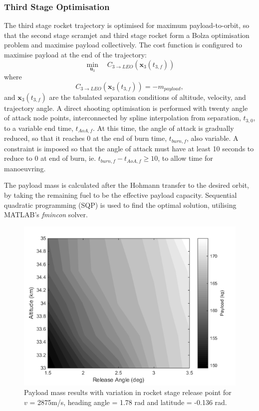 \documentclass[]{aiaa-tc}
\begin{document}
	 
	 
	  \subsubsection{Third Stage Optimisation} \label{section:thirdstage}
	  
	  
	  The third stage rocket trajectory is optimised for maximum payload-to-orbit, so that the second stage scramjet and third stage rocket form a Bolza optimisation problem and maximise payload collectively. The cost function is configured to maximise payload at the end of the trajectory:
	  \begin{equation} 
	  \min\limits_{\textbf{u}_3} \quad C_{3\rightarrow LEO}(\textbf{x}_{3}(t_{3,f})) 
	  \end{equation}
	  where
	  \begin{equation}
	  C_{3\rightarrow LEO}(\textbf{x}_{3}(t_{3,f})) = -m_{payload},
	  \end{equation}
	  and $\textbf{x}_{3}(t_{3,f})$ are the tabulated separation conditions of altitude, velocity, and trajectory angle. A direct shooting optimisation is performed with twenty angle of attack node points, interconnected by spline interpolation from separation, $t_{3,0}$, to a variable end time, $t_{AoA,f}$. At this time, the angle of attack is gradually reduced, so that it reaches 0 at the end of burn time, $t_{burn,f}$, also variable.  A constraint is imposed so that the angle of attack must have at least 10 seconds to reduce to 0 at end of burn, ie. $t_{burn,f} - t_{AoA,f} \ge 10$, to allow time for manoeuvring.
	 
	 
	  The payload mass is calculated after the Hohmann transfer to the desired orbit, by taking the remaining fuel to be the effective payload capacity. Sequential quadratic programming (SQP) is used to find the optimal solution, utilising MATLAB's \textit{fmincon} solver.
	  
	    \begin{figure}[H]
	    	\begin{center}
	    		\includegraphics[width=0.6\linewidth]{contours}
	    		\caption{Payload mass results with variation in rocket stage release point for $v$ = 2875m/s, heading angle = 1.78 rad and latitude = -0.136 rad.}
	    		\label{fig:contours}
	    	\end{center}
	    \end{figure}
	    
\end{document}
